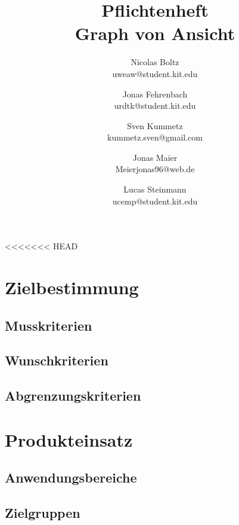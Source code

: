 \documentclass[a4paper]{scrreprt}
\begin{document}
\title{Pflichtenheft\\
Graph von Ansicht}
\date{}
\author{Nicolas Boltz   \\ uweaw@student.kit.edu
  \and Jonas Fehrenbach \\ urdtk@student.kit.edu
  \and Sven Kummetz     \\ kummetz.sven@gmail.com
  \and Jonas Maier      \\ Meierjonas96@web.de
  \and Lucas Steinmann  \\ ucemp@student.kit.edu
}
\maketitle


\tableofcontents

<<<<<<< HEAD
\chapter{Zielbestimmung}

\section{Musskriterien}

\section{Wunschkriterien}

\section{Abgrenzungskriterien}

\chapter{Produkteinsatz}
\section{Anwendungsbereiche}

\section{Zielgruppen}
\end{document}
